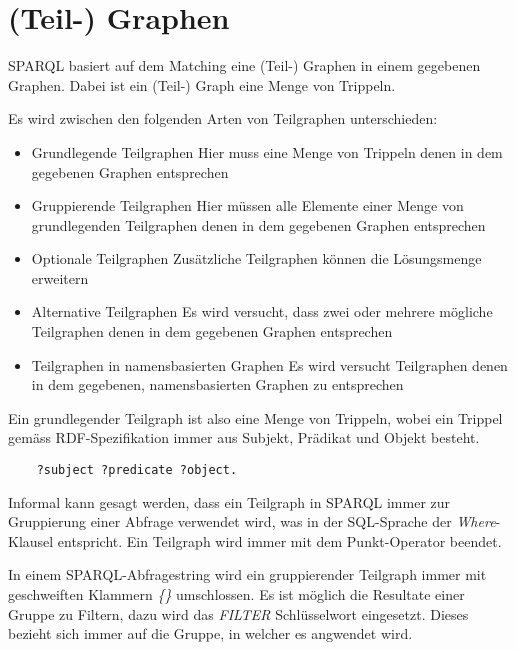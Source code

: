 \section{(Teil-) Graphen}
\label{sec:sparql_graph}

SPARQL basiert auf dem Matching eine (Teil-) Graphen in einem gegebenen Graphen. Dabei ist ein (Teil-) Graph eine Menge von Trippeln.

Es wird zwischen den folgenden Arten von Teilgraphen unterschieden:
\begin{itemize}
    \item Grundlegende Teilgraphen
    Hier muss eine Menge von Trippeln denen in dem gegebenen Graphen entsprechen
    \item Gruppierende Teilgraphen
    Hier müssen alle Elemente einer Menge von grundlegenden Teilgraphen denen in dem gegebenen Graphen entsprechen
    \item Optionale Teilgraphen
    Zusätzliche Teilgraphen können die Lösungsmenge erweitern
    \item Alternative Teilgraphen
    Es wird versucht, dass zwei oder mehrere mögliche Teilgraphen denen in dem gegebenen Graphen entsprechen
    \item Teilgraphen in namensbasierten Graphen
    Es wird versucht Teilgraphen denen in dem gegebenen, namensbasierten Graphen zu entsprechen
\end{itemize}

Ein grundlegender Teilgraph ist also eine Menge von Trippeln, wobei ein Trippel gemäss RDF-Spezifikation immer aus Subjekt, Prädikat und Objekt besteht.~\cite[3.1 Triples]{w3rdf}

\lstset{language=XML}
\begin{lstlisting}
    ?subject ?predicate ?object.
\end{lstlisting}

Informal kann gesagt werden, dass ein Teilgraph in SPARQL immer zur Gruppierung einer Abfrage verwendet wird, was in der SQL-Sprache der \textit{Where}-Klausel entspricht. Ein Teilgraph wird immer mit dem Punkt-Operator beendet.

In einem SPARQL-Abfragestring wird ein gruppierender Teilgraph immer mit geschweiften Klammern \textit{\{\}} umschlossen. Es ist möglich die Resultate einer Gruppe zu Filtern, dazu wird das \textit{FILTER} Schlüsselwort eingesetzt. Dieses bezieht sich immer auf die Gruppe, in welcher es angwendet wird.

